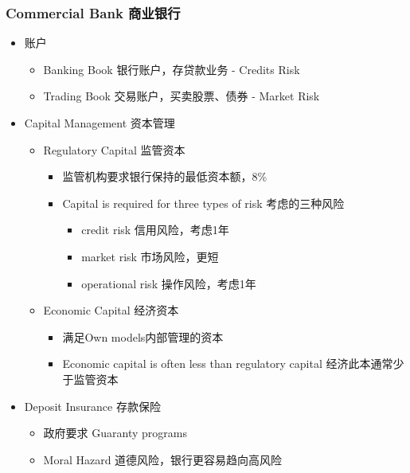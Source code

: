 \documentclass[a4paper,6pt,twoside,openany]{article}
\begin{document}
\subsubsection{Commercial Bank 商业银行}
\begin{itemize}
\item 账户
  \begin{itemize}
  \item  Banking Book 银行账户，存贷款业务 - Credits Risk
  \item Trading Book 交易账户，买卖股票、债券 - Market Risk
  \end{itemize}
\item Capital Management 资本管理
  \begin{itemize}
  \item Regulatory Capital 监管资本
    \begin{itemize}
    \item 监管机构要求银行保持的最低资本额，8\%
    \item Capital is required for three types of risk 考虑的三种风险
      \begin{itemize}
      \item credit risk 信用风险，考虑1年
      \item market risk 市场风险，更短
      \item operational risk 操作风险，考虑1年
      \end{itemize}
    \end{itemize}
  \item Economic Capital 经济资本
    \begin{itemize}
    \item 满足Own models内部管理的资本
      \item Economic capital is often less than regulatory capital 经济此本通常少于监管资本
    \end{itemize}
     \end{itemize}
\item Deposit Insurance 存款保险
  \begin{itemize}
  \item 政府要求 Guaranty programs
  \item Moral Hazard 道德风险，银行更容易趋向高风险
  \end{itemize}
\end{itemize}
\end{document}
